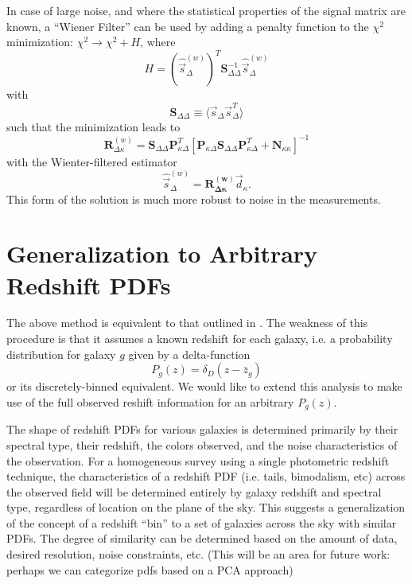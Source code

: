 \documentclass[12pt,preprint]{aastex}			%
\begin{document}
In case of large noise, and where the 
statistical properties of the signal matrix are known, a ``Wiener Filter''
can be used by adding a penalty function to the $\chi^2$ minimization: $\chi^2 \to \chi^2 + H$, where
\begin{equation}
  H = \left(\hat{\vec{s}}^{(w)}_\Delta\right)^T \mathbf{S}^{-1}_{\Delta\Delta} \hat{\vec{s}}^{(w)}_\Delta
\end{equation}
with
\begin{equation}
  \label{SDD}
  \mathbf{S}_{\Delta\Delta} \equiv \langle \vec{s}_\Delta \vec{s}_\Delta^T \rangle
\end{equation}
such that the minimization leads to
\begin{equation}
  \label{Wiener_R}
  \mathbf{R}^{(w)}_{\Delta\kappa} = \mathbf{S}_{\Delta\Delta}\mathbf{P}^T_{\kappa\Delta} \left[\mathbf{P}_{\kappa\Delta}\mathbf{S}_{\Delta\Delta}\mathbf{P}^T_{\kappa\Delta} + \mathbf{N}_{\kappa\kappa} \right]^{-1}
\end{equation}
with the Wienter-filtered estimator
\begin{equation}
  \label{Wiener_s}
  \hat{\vec{s}}^{(w)}_\Delta = \mathbf{R^{(w)}_{\Delta\kappa}} \vec{d}_\kappa.
\end{equation}
This form of the solution is much more robust to noise in the measurements.
 
\section{Generalization to Arbitrary Redshift PDFs}
The above method is equivalent to that outlined in \citet{Hu02}.  The weakness of this procedure is that it assumes a known redshift for each galaxy, i.e. a probability distribution for galaxy $g$ given by a delta-function
\begin{equation}
  P_g(z) = \delta_D(z-\bar{z}_g)
\end{equation}
or its discretely-binned equivalent.  We would like to extend this analysis 
to make use of the full observed reshift information for an arbitrary $P_g(z)$.

The shape of redshift PDFs for various galaxies is determined primarily by 
their spectral type, their redshift, the colors observed, and the noise 
characteristics of the observation.  For a homogeneous survey using a single 
photometric redshift technique, the characteristics of a redshift PDF (i.e. 
tails, bimodalism, etc) across the observed field will be determined entirely 
by galaxy redshift and spectral type, regardless of location on the plane of 
the sky.  This suggests a generalization of the concept of a redshift ``bin'' 
to a set of galaxies across the sky with similar PDFs.  The degree of 
similarity can be determined based on the amount of data, desired resolution, 
noise constraints, etc.  (This will be an area for future work: perhaps we 
can categorize pdfs based on a PCA approach)
\end{document}
